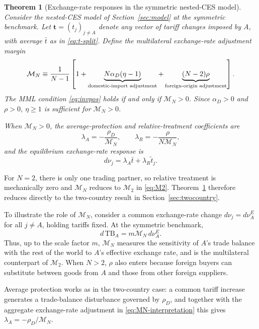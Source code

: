 \documentclass[11pt]{article}
\newtheorem{theorem}{Theorem}[section]
\begin{document}
\begin{theorem}[Exchange-rate responses in the symmetric nested-CES model]
\label{thm:nested-ces}
Consider the nested-CES model of Section~\ref{sec:model} at the symmetric benchmark. Let $\mathbf t=(t_j)_{j\neq A}$ denote any vector of tariff changes imposed by $A$, with average $\bar t$ as in \eqref{eq:t-split}. Define the multilateral exchange-rate adjustment margin
\begin{equation}
\mathcal M_N\equiv
\frac{1}{N-1}
\left[
1
+
\underbrace{N\alpha_D(\eta-1)}_{\textnormal{domestic-import adjustment}}
+
\underbrace{(N-2)\rho}_{\textnormal{foreign-origin adjustment}}
\right].
\label{eq:MN}
\end{equation}
The MML condition \eqref{eq:invpos} holds if and only if $\mathcal M_N>0$. Since $\alpha_D>0$ and $\rho>0$, $\eta\geq1$ is sufficient for $\mathcal M_N>0$.

When $\mathcal M_N>0$, the average-protection and relative-treatment coefficients are
\[
\lambda_A=-\frac{\rho_D}{\mathcal M_N},
\qquad
\lambda_R=-\frac{\rho}{N\mathcal M_N},
\]
and the equilibrium exchange-rate response is
\begin{equation}
d\nu_j=\lambda_A\bar t+\lambda_R\tilde t_j.
\label{eq:scale-disc}
\end{equation}
\end{theorem}

For $N=2$, there is only one trading partner, so relative treatment is mechanically zero and $\mathcal M_N$ reduces to $\mathcal M_2$ in \eqref{eq:M2}. Theorem~\ref{thm:nested-ces} therefore reduces directly to the two-country result in Section~\ref{sec:twocountry}.

To illustrate the role of $\mathcal M_N$, consider a common exchange-rate change $d\nu_j=d\nu_A^E$ for all $j\neq A$, holding tariffs fixed. At the symmetric benchmark,
\begin{equation}
d\,\mathrm{TB}_A=m\mathcal M_N\,d\nu_A^E.
\label{eq:MN-interpretation}
\end{equation}
Thus, up to the scale factor $m$, $\mathcal M_N$ measures the sensitivity of $A$'s trade balance with the rest of the world to $A$'s effective exchange rate, and is the multilateral counterpart of $\mathcal M_2$. When $N>2$, $\rho$ also enters because foreign buyers can substitute between goods from $A$ and those from other foreign suppliers.

Average protection works as in the two-country case: a common tariff increase generates a trade-balance disturbance governed by $\rho_D$, and together with the aggregate exchange-rate adjustment in \eqref{eq:MN-interpretation} this gives $\lambda_A=-\rho_D/\mathcal M_N$.
\end{document}
